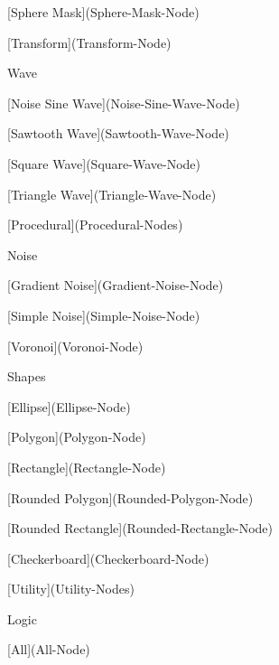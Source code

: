 \begin{DoxyItemize}
\begin{DoxyItemize}
\begin{DoxyItemize}
\begin{DoxyItemize}
\item \mbox{[}Sphere Mask\mbox{]}(Sphere-\/\+Mask-\/\+Node)
\item \mbox{[}Transform\mbox{]}(Transform-\/\+Node)
\end{DoxyItemize}
\item Wave
\begin{DoxyItemize}
\item \mbox{[}Noise Sine Wave\mbox{]}(Noise-\/\+Sine-\/\+Wave-\/\+Node)
\item \mbox{[}Sawtooth Wave\mbox{]}(Sawtooth-\/\+Wave-\/\+Node)
\item \mbox{[}Square Wave\mbox{]}(Square-\/\+Wave-\/\+Node)
\item \mbox{[}Triangle Wave\mbox{]}(Triangle-\/\+Wave-\/\+Node)
\end{DoxyItemize}
\end{DoxyItemize}
\item \mbox{[}Procedural\mbox{]}(Procedural-\/\+Nodes)
\begin{DoxyItemize}
\item Noise
\begin{DoxyItemize}
\item \mbox{[}Gradient Noise\mbox{]}(Gradient-\/\+Noise-\/\+Node)
\item \mbox{[}Simple Noise\mbox{]}(Simple-\/\+Noise-\/\+Node)
\item \mbox{[}Voronoi\mbox{]}(Voronoi-\/\+Node)
\end{DoxyItemize}
\item Shapes
\begin{DoxyItemize}
\item \mbox{[}Ellipse\mbox{]}(Ellipse-\/\+Node)
\item \mbox{[}Polygon\mbox{]}(Polygon-\/\+Node)
\item \mbox{[}Rectangle\mbox{]}(Rectangle-\/\+Node)
\item \mbox{[}Rounded Polygon\mbox{]}(Rounded-\/\+Polygon-\/\+Node)
\item \mbox{[}Rounded Rectangle\mbox{]}(Rounded-\/\+Rectangle-\/\+Node)
\end{DoxyItemize}
\item \mbox{[}Checkerboard\mbox{]}(Checkerboard-\/\+Node)
\end{DoxyItemize}
\item \mbox{[}Utility\mbox{]}(Utility-\/\+Nodes)
\begin{DoxyItemize}
\item Logic
\begin{DoxyItemize}
\item \mbox{[}All\mbox{]}(All-\/\+Node)

\end{DoxyItemize}
\end{DoxyItemize}
\end{DoxyItemize}
\end{DoxyItemize}
